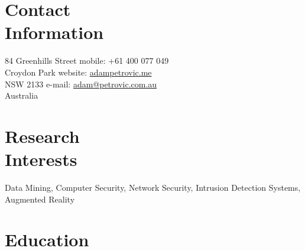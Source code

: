 \documentclass[margin,line]{resume}
\begin{document}
\vspace{2mm}
\begin{resume}

    \section{\mysidestyle Contact\\Information}

    84 Greenhills Street	                            \hfill mobile: +61 400 077 049          \vspace{0mm}\\\vspace{0mm}%
    Croydon Park					    \hfill website: \href{http://www.adampetrovic.me}{adampetrovic.me}		\vspace{0mm}\\\vspace{0mm}%
    NSW 2133						    \hfill e-mail: \href{mailto:adam@petrovic.com.au}{adam@petrovic.com.au}	  \vspace{0mm}\\\vspace{-4.5mm}%
    Australia				


    \section{\mysidestyle Research\\Interests}

    Data Mining, Computer Security, Network Security, Intrusion Detection Systems, Augmented Reality \\ 


    \section{\mysidestyle Education}


\end{resume}
\end{document}
